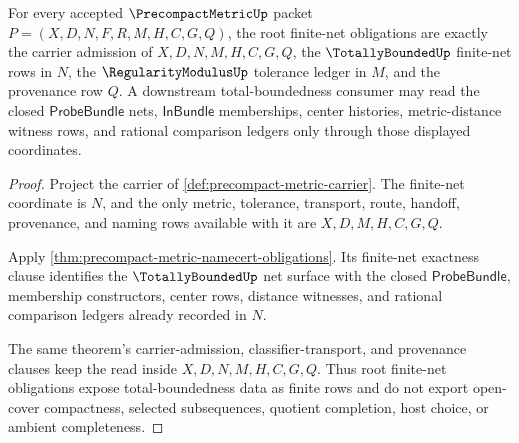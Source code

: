 \begin{theorem}
\label{thm:precompactmetric-root-finite-net-obligations}
For every accepted $\PrecompactMetricUp$ packet $P=(X,D,N,F,R,M,H,C,G,Q)$, the root finite-net obligations are exactly the carrier admission of $X,D,N,M,H,C,G,Q$, the $\TotallyBoundedUp$ finite-net rows in $N$, the $\RegularityModulusUp$ tolerance ledger in $M$, and the provenance row $Q$. A downstream total-boundedness consumer may read the closed $\mathsf{ProbeBundle}$ nets, $\mathsf{InBundle}$ memberships, center histories, metric-distance witness rows, and rational comparison ledgers only through those displayed coordinates.
\end{theorem}
\begin{proof}
Project the carrier of \autoref{def:precompact-metric-carrier}. The finite-net coordinate is $N$, and the only metric, tolerance, transport, route, handoff, provenance, and naming rows available with it are $X,D,M,H,C,G,Q$.

Apply \autoref{thm:precompact-metric-namecert-obligations}. Its finite-net exactness clause identifies the $\TotallyBoundedUp$ net surface with the closed $\mathsf{ProbeBundle}$, membership constructors, center rows, distance witnesses, and rational comparison ledgers already recorded in $N$.

The same theorem's carrier-admission, classifier-transport, and provenance clauses keep the read inside $X,D,N,M,H,C,G,Q$. Thus root finite-net obligations expose total-boundedness data as finite rows and do not export open-cover compactness, selected subsequences, quotient completion, host choice, or ambient completeness.
\end{proof}

